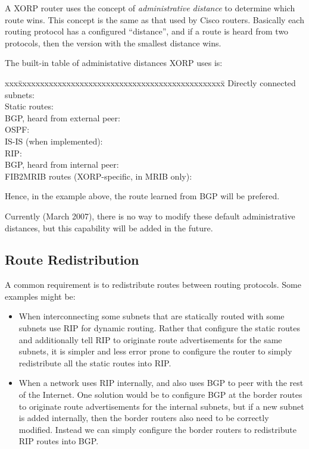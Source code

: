 A XORP router uses the concept of {\it administrative distance} to
determine which route wins.  This concept is the same as that used by
Cisco routers.  Basically each routing protocol has a configured
``distance'', and if a route is heard from two protocols, then the
version with the smallest distance wins.

The built-in table of administative distances XORP uses is:
\begin{tabbing}
xxx\=xxxxxxxxxxxxxxxxxxxxxxxxxxxxxxxxxxxxxxxxxxxxxxx\=\kill
\>Directly connected subnets: \\
\>Static routes:\\
\>BGP, heard from external peer:\\
\>OSPF:\\
\>IS-IS (when implemented):\\
\>RIP:\\
\>BGP, heard from internal peer:\\
\>FIB2MRIB routes (XORP-specific, in MRIB only):
\end{tabbing}
Hence, in the example above, the route learned from BGP will be prefered.

Currently (March 2007), there is no way to modify these default
administrative distances, but this capability will be added in the future.

\subsection{Route Redistribution}

A common requirement is to redistribute routes between routing
protocols.  Some examples might be:

\begin{itemize}
\item When interconnecting some subnets that are statically routed
  with some subnets use RIP for dynamic routing.  Rather
  that configure the static routes and additionally tell RIP to
  originate route advertisements for the same subnets, it is simpler
  and less error prone to configure the router to simply redistribute
  all the static routes into RIP.
\item When a network uses RIP internally, and also uses BGP to
  peer with the rest of the Internet.  One solution would be to
  configure BGP at the border routes to originate route advertisements
  for the internal subnets, but if a new subnet is added internally,
  then the border routers also need to be correctly modified.  Instead
  we can simply configure the border routers to redistribute RIP
  routes into BGP.  
\end{itemize}

